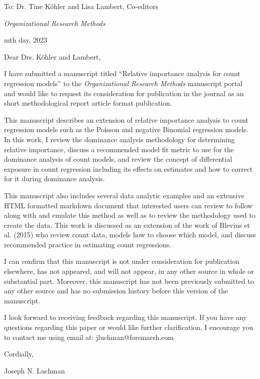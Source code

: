 \documentclass[10pt,letterpaper]{letter}
\begin{document}
	
	To: Dr. Tine K{\"o}hler and Lisa Lambert, Co-editors
	
	\emph{Organizational Research Methods}
	
	mth day, 2023
	
	Dear Drs. K{\"o}hler and Lambert,
	
	I have submitted a manuscript titled “Relative importance analysis for count regression models” to the \emph{Organizational Research Methods} manuscript portal and would like to request its consideration for publication in the journal as an short methodological report article format publication.
	
	This manuscript describes an extension of relative importance analysis to count regression models such as the Poisson and negative Binomial regression models. In this work, I review the dominance analysis methodology for determining relative importance, discuss a recommended model fit metric to use for the dominance analysis of count models, and review the concept of differential exposure in count regression including its effects on estimates and how to correct for it during dominance analysis.
	
	This manuscript also includes several data analytic examples and an extensive HTML formatted markdown document that interested users can review to follow along with and emulate this method as well as to review the methodology used to create the data. This work is discussed as an extension of the work of Blevins et al. (2015) who review count data, models how to choose which model, and discuss recommended practice in estimating count regressions. 
	
	I can confirm that this manuscript is not under consideration for publication elsewhere, has not appeared, and will not appear, in any other source in whole or substantial part. Moreover, this manuscript has not been previously submitted to any other source and has no submission history before this version of the manuscript. 
	
	I look forward to receiving feedback regarding this manuscript. If you have any questions regarding this paper or would like further clarification, I encourage you to contact me using email at: jluchman@forsmarsh.com
	
	Cordially,
	
	Joseph N. Luchman
\end{document}
